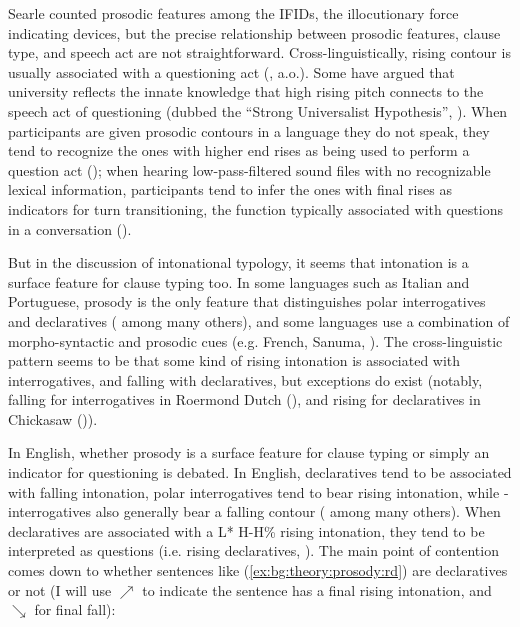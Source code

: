 Searle counted prosodic features among the IFIDs, the illocutionary force indicating devices, but the
precise relationship between prosodic features, clause type, and speech act are not straightforward. Cross-linguistically, rising contour is usually associated with a questioning act (\citealt{bolinger1978, ladd1981, gussenhovenchen2000, ladd2001typology}, a.o.). Some have argued that university reflects the innate knowledge that high rising pitch connects to the speech act of questioning (dubbed the ``Strong Universalist Hypothesis'', \cite{ladd1981}). When participants are given prosodic contours in a language they do not speak, they tend to recognize the ones with higher end rises as being used to perform a question act (\cite{gussenhovenchen2000}); when hearing low-pass-filtered sound files with no recognizable lexical information, participants tend to infer the ones with final rises as indicators for turn transitioning, the function typically associated with questions in a conversation (\cite{bogels2015prosodyturn}). 

But in the discussion of intonational typology, it seems that intonation is a surface feature for clause typing too. In some languages such as Italian and Portuguese, prosody is the only feature that distinguishes polar interrogatives and declaratives (\citealt{truckenbrodt2009prosody} among many others), and some languages use a combination of morpho-syntactic and prosodic cues (e.g. French, Sanuma, \cite{konig2007, aikhenvald2016}). The cross-linguistic pattern seems to be that some kind of rising intonation is associated with interrogatives, and falling with declaratives, but exceptions do exist (notably, falling for interrogatives in Roermond Dutch (\cite{gussenhoven2002}), and rising for declaratives in Chickasaw (\cite{gordon1999prosody})). 



In English, whether prosody is a surface feature for clause typing or simply an indicator for questioning is debated. In English, declaratives tend to be associated with falling intonation, polar interrogatives tend to bear rising intonation, while \twh-interrogatives also generally bear a falling contour (\citealt{ladd1981, ladd2008intonational, hedberg2004wh, hedberg2014corpus} among many others). When declaratives are associated with a  L* H-H\% rising intonation, they tend to be interpreted as questions (i.e. rising declaratives, \citealt{ladd1981,gunlogson2004,gunlogson2008,jeong2018,rudin2018,goodhue2021rd}). The main point of contention comes down to whether sentences like (\ref{ex:bg:theory:prosody:rd}) are declaratives or not (I will use $\nearrow$ to indicate the sentence has a final rising intonation, and $\searrow$ for final fall):
 
